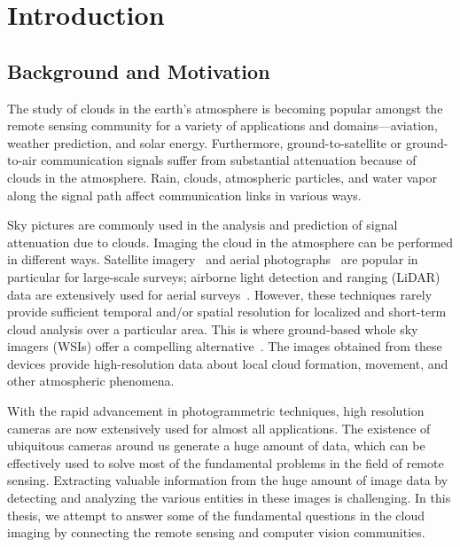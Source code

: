 \chapter{Introduction}
\label{chap:intro}

\newcommand\tab[1][0.5cm]{\hspace*{#1}}


\section{Background and Motivation}

The study of clouds in the earth's atmosphere is becoming popular amongst the remote sensing community for a variety of applications and domains---aviation, weather prediction, and solar energy. Furthermore, ground-to-satellite or ground-to-air communication signals suffer from substantial attenuation because of clouds in the atmosphere. Rain, clouds, atmospheric particles, and water vapor along the signal path affect communication links in various ways. 

Sky pictures are commonly used in the analysis and prediction of signal attenuation due to clouds. Imaging the cloud in the atmosphere can be performed in different ways. Satellite imagery~\cite{PALSAR,sat_reg} and aerial photographs~\cite{air1} are popular in particular for large-scale surveys; airborne light detection and ranging (LiDAR) data are extensively used for aerial surveys~\cite{LIDAR1}. However, these techniques rarely provide sufficient temporal and/or spatial resolution for localized and short-term cloud analysis over a particular area. This is where ground-based whole sky imagers (WSIs) offer a compelling alternative~\cite{WAHRSIS}. The images obtained from these devices provide high-resolution data about local cloud formation, movement, and other atmospheric phenomena. 

With the rapid advancement in photogrammetric techniques, high resolution cameras are now extensively used for almost all applications. The existence of ubiquitous cameras around us generate a huge amount of data, which can be effectively used to solve most of the fundamental problems in the field of remote sensing. Extracting valuable information from the huge amount of image data by detecting and analyzing the various entities in these images is challenging. In this thesis, we attempt to answer some of the fundamental questions in the cloud imaging by connecting the remote sensing and computer vision communities. 

